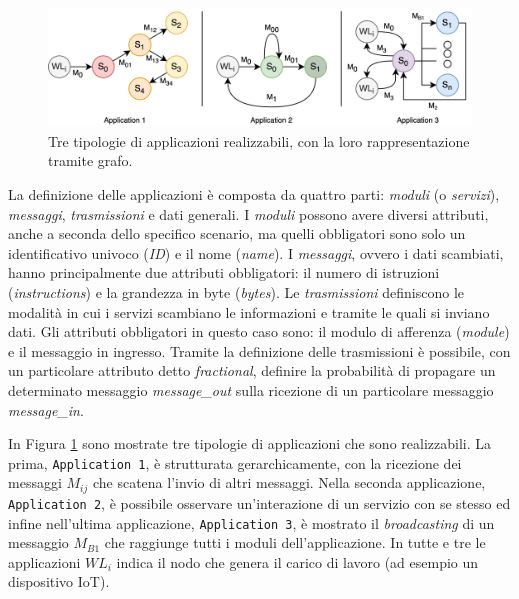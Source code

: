 \begin{figure}[!ht]
  \includegraphics[width=14cm]{images/applications_ddf}
  \centering
  \caption{Tre tipologie di applicazioni realizzabili, con la loro rappresentazione tramite grafo.}
  \label{fig:applications_ddf}
\end{figure}

La definizione delle applicazioni è composta da quattro parti: \textit{moduli} (o \textit{servizi}), \textit{messaggi}, \textit{trasmissioni} e dati generali. I \textit{moduli} possono avere diversi attributi, anche a seconda dello specifico scenario, ma quelli obbligatori sono solo un identificativo univoco (\textit{ID}) e il nome (\textit{name}). I \textit{messaggi}, ovvero i dati scambiati, hanno principalmente due attributi obbligatori: il numero di istruzioni (\textit{instructions}) e la grandezza in byte (\textit{bytes}). Le \textit{trasmissioni} definiscono le modalità in cui i servizi scambiano le informazioni e tramite le quali si inviano dati. Gli attributi obbligatori in questo caso sono: il modulo di afferenza (\textit{module}) e il messaggio in ingresso. Tramite la definizione delle trasmissioni è possibile, con un particolare attributo detto \textit{fractional}, definire la probabilità di propagare un determinato messaggio \textit{message\_out} sulla ricezione di un particolare messaggio \textit{message\_in}. 

In Figura \ref{fig:applications_ddf} sono mostrate tre tipologie di applicazioni che sono realizzabili. La prima, \texttt{Application 1}, è strutturata gerarchicamente, con la ricezione dei messaggi $M_{ij}$ che scatena l'invio di altri messaggi. Nella seconda applicazione, \texttt{Application 2}, è possibile osservare un'interazione di un servizio con se stesso ed infine nell'ultima applicazione, \texttt{Application 3}, è mostrato il \textit{broadcasting} di un messaggio $M_{B1}$ che raggiunge tutti i moduli dell'applicazione. In tutte e tre le applicazioni $WL_i$ indica il nodo che genera il carico di lavoro (ad esempio un dispositivo IoT).

